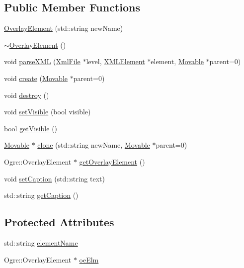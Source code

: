 \subsection*{Public Member Functions}
\begin{DoxyCompactItemize}
\item 
\hyperlink{class_rad_xml_1_1_overlay_element_a896932bda25533df22a43fd0b4e78060}{Overlay\-Element} (std\-::string new\-Name)
\item 
\hyperlink{class_rad_xml_1_1_overlay_element_ab2d12dc2d9d9c7b2ac460c8f853f7936}{$\sim$\-Overlay\-Element} ()
\item 
void \hyperlink{class_rad_xml_1_1_overlay_element_aedf82660f54fd19d15b4f4e4cb90f6cd}{parse\-X\-M\-L} (\hyperlink{class_rad_xml_1_1_xml_file}{Xml\-File} $\ast$level, \hyperlink{class_x_m_l_element}{X\-M\-L\-Element} $\ast$element, \hyperlink{class_rad_xml_1_1_movable}{Movable} $\ast$parent=0)
\item 
void \hyperlink{class_rad_xml_1_1_overlay_element_a5397081614b86c19cdd476aafe9b5a23}{create} (\hyperlink{class_rad_xml_1_1_movable}{Movable} $\ast$parent=0)
\item 
void \hyperlink{class_rad_xml_1_1_overlay_element_a60bb3d95c2bc647126ad9fdaeb08abf5}{destroy} ()
\item 
void \hyperlink{class_rad_xml_1_1_overlay_element_a12b2724a470e6c9852f59c14354c3779}{set\-Visible} (bool visible)
\item 
bool \hyperlink{class_rad_xml_1_1_overlay_element_a845ff1011eb3ac2feb3ec213714e9ac2}{get\-Visible} ()
\item 
\hyperlink{class_rad_xml_1_1_movable}{Movable} $\ast$ \hyperlink{class_rad_xml_1_1_overlay_element_ab355d456118ab15e212d0057c615df61}{clone} (std\-::string new\-Name, \hyperlink{class_rad_xml_1_1_movable}{Movable} $\ast$parent=0)
\item 
Ogre\-::\-Overlay\-Element $\ast$ \hyperlink{class_rad_xml_1_1_overlay_element_a2b52cee3685b7694f259bb0396b41921}{get\-Overlay\-Element} ()
\item 
void \hyperlink{class_rad_xml_1_1_overlay_element_a159eec93b4da86a39399548366e33fae}{set\-Caption} (std\-::string text)
\item 
std\-::string \hyperlink{class_rad_xml_1_1_overlay_element_a44e43631fb46b131d6b931fb68ffa1ab}{get\-Caption} ()
\end{DoxyCompactItemize}
\subsection*{Protected Attributes}
\begin{DoxyCompactItemize}
\item 
std\-::string \hyperlink{class_rad_xml_1_1_overlay_element_a60a70b104dc21f93f6b39abe2208f771}{element\-Name}
\item 
Ogre\-::\-Overlay\-Element $\ast$ \hyperlink{class_rad_xml_1_1_overlay_element_ad1e1b7f9920f00ba26f5e7772d194a78}{oe\-Elm}
\end{DoxyCompactItemize}
